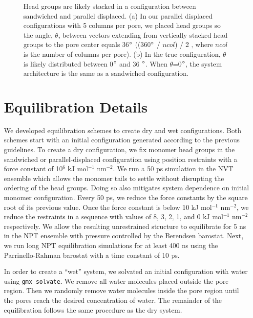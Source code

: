 \documentclass{article}
\begin{document}
\begin{figure}[!htb]
\begin{subfigure}{0.45\textwidth}
  \caption{}\label{fig:pd_lt36}
  \end{subfigure}
  \caption{Head groups are likely stacked in a configuration between sandwiched and
  parallel displaced. (a) In our parallel displaced configurations with 5 columns 
  per pore, we placed head groups so the angle, $\theta$, between vectors extending
  from vertically stacked head groups to the pore center equals 36$\degree$ 
  ((360$\degree$ / $ncol$) / 2 , where $ncol$ is the number of columns per pore). 
  (b) In the true configuration, $\theta$ is likely distributed between 0$\degree$
  and 36 $\degree$. When $\theta$=0$\degree$, the system architecture is the same
  as a sandwiched configuration.}\label{fig:between_pd}
  \end{figure}

  \section{Equilibration Details}\label{section:equilibration}
  
  We developed equilibration schemes to create dry and wet configurations. Both
  schemes start with an initial configuration generated according to the previous
  guidelines. To create a dry configuration, we fix monomer head groups in the
  sandwiched or parallel-displaced configuration using position restraints with a
  force constant of 10$^6$ kJ mol$^{-1}$ nm$^{-2}$. We run a 50 ps simulation in
  the NVT ensemble which allows the monomer tails to settle without disrupting
  the ordering of the head groups. Doing so also mitigates system dependence on
  initial monomer configuration. Every 50 ps, we reduce the force constants by
  the square root of its previous value. Once the force constant is below 10 kJ
  mol$^{-1}$ nm$^{-2}$, we reduce the restraints in a sequence with values of
  8, 3, 2, 1, and 0 kJ mol$^{-1}$ nm$^{-2}$ respectively. We allow the resulting
  unrestrained structure to equilibrate for 5 ns in the NPT ensemble
  with pressure controlled by the Berendsen barostat. Next, we run long NPT
  equilibration simulations for at least 400 ns using the Parrinello-Rahman
  barostat with a time constant of 10 ps.

  In order to create a ``wet'' system, we solvated an initial configuration with
  water using \texttt{gmx solvate}. We remove all water molecules placed outside
  the pore region. Then we randomly remove water molecules inside the pore region
  until the pores reach the desired concentration of water. The remainder of the
  equilibration follows the same procedure as the dry system. 
\end{document}

